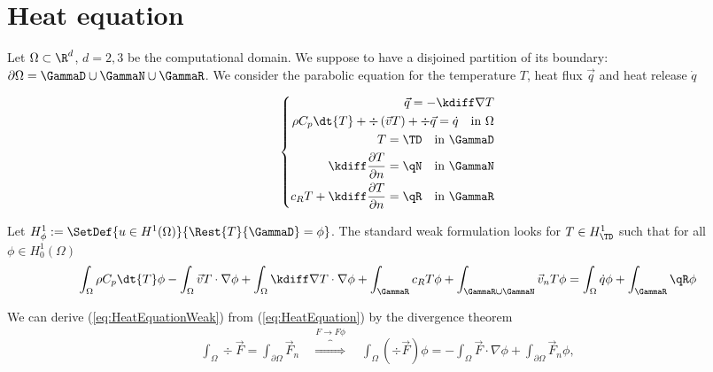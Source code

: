 %
\section{Heat equation}\label{sec:Heat}
%
Let $\Omega\subset \R^d$, $d=2,3$ be the computational domain. We suppose to have a disjoined partition of its boundary:
$\partial\Omega=\GammaD\cup\GammaN\cup\GammaR$.
%
We consider the parabolic equation for the temperature $T$, heat flux $\vec{q}$ and heat release $\dot{q}$
%
\begin{yellowbox}
\begin{equation}\label{eq:HeatEquation}
%
\left\{
\begin{aligned}
\vec{q} = - \kdiff \nabla T\\
\rho C_p \dt{T} + \div\left(\vec{v} T\right)+\div\vec{q} = \dot{q} \quad \mbox{in $\Omega$}\\
T = \TD \quad \mbox{in $\GammaD$}\\
\kdiff\frac{\partial T}{\partial n} = \qN \quad \mbox{in $\GammaN$}\\
c_R T + \kdiff\frac{\partial T}{\partial n}= \qR \quad \mbox{in $\GammaR$}
\end{aligned}
\right.
%
\end{equation}
\end{yellowbox}
%
\begin{yellowbox}
Let $H^1_{\phi}:= \SetDef{u\in H^1(\Omega)}{\Rest{T}{\GammaD} = \phi}$. The standard weak formulation looks for 
$T\in H^1_{\TD}$ such that for all $\phi\in H^1_{0}(\Omega)$
%
\begin{equation}\label{eq:HeatEquationWeak}
\int_{\Omega}\rho C_p \dt{T}\phi - \int_{\Omega}\vec{v} T\cdot \nabla \phi
+  \int_{\Omega} \kdiff\nabla T \cdot\nabla \phi + \int_{\GammaR} c_R T \phi 
+ \int_{\GammaR\cup\GammaN} \vec{v}_n T \phi
= \int_{\Omega} \dot{q} \phi +  \int_{\GammaR} \qR \phi
\end{equation}
\end{yellowbox}
%
We can derive (\ref{eq:HeatEquationWeak}) from (\ref{eq:HeatEquation}) by the divergence theorem
%
\begin{align*}
\int_{\Omega} \div\vec{F} = \int_{\partial\Omega} \vec{F}_n\quad\overbrace{\Longrightarrow}^{F\to F\phi}\quad 
\int_{\Omega} (\div\vec{F}) \phi = -\int_{\Omega} \vec{F}\cdot \nabla\phi + \int_{\partial\Omega} \vec{F}_n\phi,
\end{align*}
